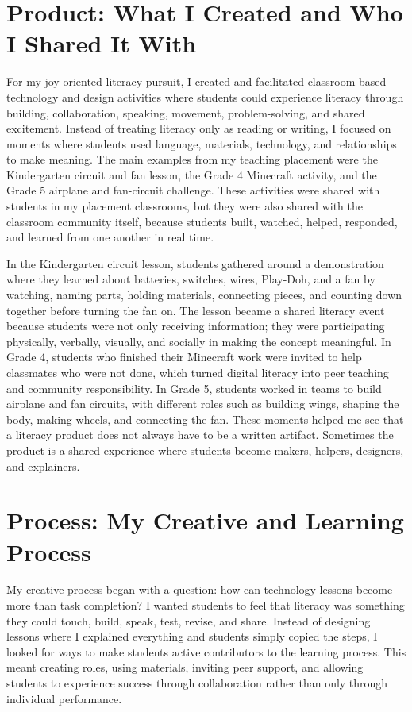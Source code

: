 \documentclass[12pt]{article}
\begin{document}
\section*{Product: What I Created and Who I Shared It With}

For my joy-oriented literacy pursuit, I created and facilitated classroom-based technology and design activities where students could experience literacy through building, collaboration, speaking, movement, problem-solving, and shared excitement. Instead of treating literacy only as reading or writing, I focused on moments where students used language, materials, technology, and relationships to make meaning. The main examples from my teaching placement were the Kindergarten circuit and fan lesson, the Grade 4 Minecraft activity, and the Grade 5 airplane and fan-circuit challenge. These activities were shared with students in my placement classrooms, but they were also shared with the classroom community itself, because students built, watched, helped, responded, and learned from one another in real time.

In the Kindergarten circuit lesson, students gathered around a demonstration where they learned about batteries, switches, wires, Play-Doh, and a fan by watching, naming parts, holding materials, connecting pieces, and counting down together before turning the fan on. The lesson became a shared literacy event because students were not only receiving information; they were participating physically, verbally, visually, and socially in making the concept meaningful. In Grade 4, students who finished their Minecraft work were invited to help classmates who were not done, which turned digital literacy into peer teaching and community responsibility. In Grade 5, students worked in teams to build airplane and fan circuits, with different roles such as building wings, shaping the body, making wheels, and connecting the fan. These moments helped me see that a literacy product does not always have to be a written artifact. Sometimes the product is a shared experience where students become makers, helpers, designers, and explainers.

\section*{Process: My Creative and Learning Process}

My creative process began with a question: how can technology lessons become more than task completion? I wanted students to feel that literacy was something they could touch, build, speak, test, revise, and share. Instead of designing lessons where I explained everything and students simply copied the steps, I looked for ways to make students active contributors to the learning process. This meant creating roles, using materials, inviting peer support, and allowing students to experience success through collaboration rather than only through individual performance.
\end{document}

